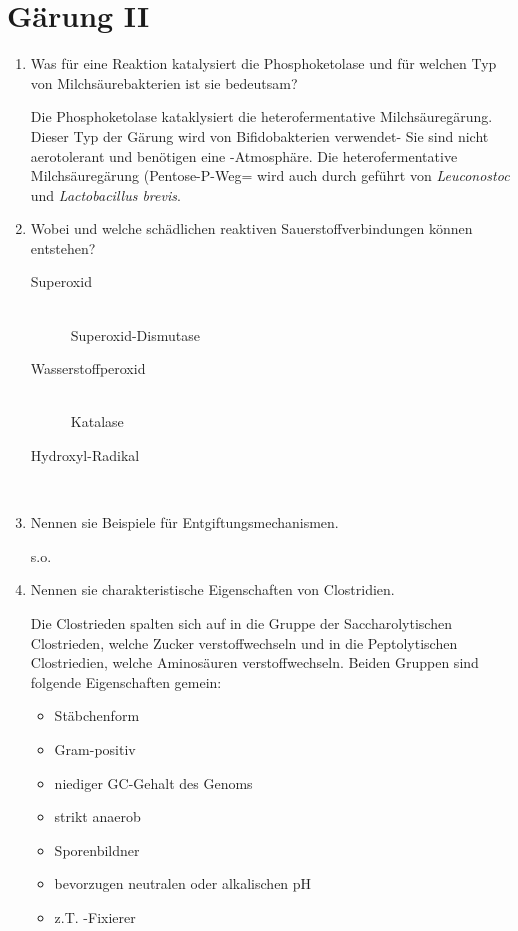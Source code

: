 
\section{Gärung II}
\begin{enumerate}
	\item Was für eine Reaktion katalysiert die Phosphoketolase und für welchen Typ von Milchsäurebakterien ist sie bedeutsam?

		Die Phosphoketolase kataklysiert die heterofermentative Milchsäuregärung.
		Dieser Typ der Gärung wird von Bifidobakterien verwendet-
		Sie sind nicht aerotolerant und benötigen eine -Atmosphäre.
		Die heterofermentative Milchsäuregärung (Pentose-P-Weg= wird auch durch geführt von \emph{Leuconostoc} und
		\emph{Lactobacillus brevis}.
		
	\item Wobei und welche schädlichen reaktiven Sauerstoffverbindungen können entstehen?

		\begin{description}
			\item[Superoxid ] \hfill\\
				Superoxid-Dismutase
			\item[Wasserstoffperoxid ] \hfill\\
				Katalase
			\item[Hydroxyl-Radikal ] \hfill\\
		\end{description}

	\item Nennen sie Beispiele für Entgiftungsmechanismen.
		
			s.o.

	\item Nennen sie charakteristische Eigenschaften von Clostridien.
		
		Die Clostrieden spalten sich auf in die Gruppe der Saccharolytischen Clostrieden,
		welche Zucker verstoffwechseln und
		in die Peptolytischen Clostriedien,
		welche Aminosäuren verstoffwechseln.
		Beiden Gruppen sind folgende Eigenschaften gemein:
		\begin{itemize}
			\item Stäbchenform
			\item Gram-positiv
			\item niediger GC-Gehalt des Genoms
			\item strikt anaerob
			\item Sporenbildner
			\item bevorzugen neutralen oder alkalischen pH
			\item z.T. -Fixierer
		\end{itemize}


\end{enumerate}

